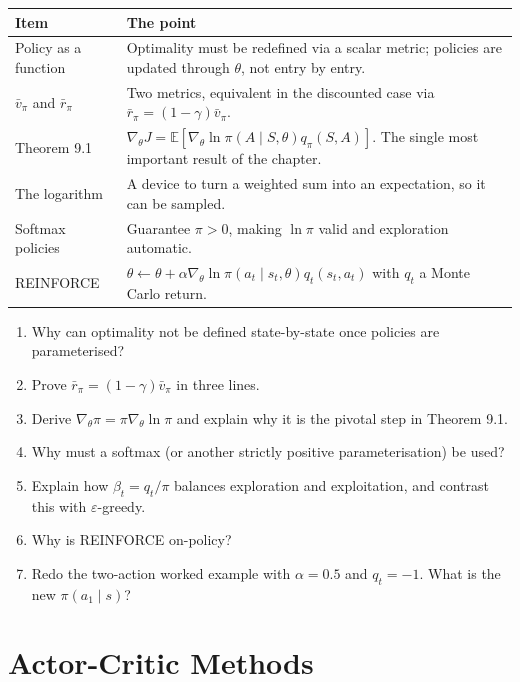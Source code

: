 \documentclass[11pt, letterpaper]{article}
\theoremstyle{runin}
\theoremstyle{runinplain}
\theoremstyle{remark}
\newcommand{\E}{\mathbb{E}}
\begin{document}
\begin{center}
\small
\begin{tabular}{@{}lp{}@{}}
\toprule
Item & The point \\
\midrule
Policy as a function & Optimality must be redefined via a scalar metric; policies are updated through $\theta$, not entry by entry. \\
$\bar v_\pi$ and $\bar r_\pi$ & Two metrics, equivalent in the discounted case via $\bar r_\pi=(1-\gamma)\bar v_\pi$. \\
Theorem 9.1 & $\nabla_\theta J=\E[\nabla_\theta\ln\pi(A\mid S,\theta)q_\pi(S,A)]$. The single most important result of the chapter. \\
The logarithm & A device to turn a weighted sum into an expectation, so it can be sampled. \\
Softmax policies & Guarantee $\pi>0$, making $\ln\pi$ valid and exploration automatic. \\
REINFORCE & $\theta\leftarrow\theta+\alpha\nabla_\theta\ln\pi(a_t\mid s_t,\theta)q_t(s_t,a_t)$ with $q_t$ a Monte Carlo return. \\
\bottomrule
\end{tabular}
\end{center}

\begin{enumerate}
  \item Why can optimality not be defined state-by-state once policies are
        parameterised?
  \item Prove $\bar r_\pi=(1-\gamma)\bar v_\pi$ in three lines.
  \item Derive $\nabla_\theta\pi=\pi\nabla_\theta\ln\pi$ and explain why it is the
        pivotal step in Theorem 9.1.
  \item Why must a softmax (or another strictly positive parameterisation) be used?
  \item Explain how $\beta_t=q_t/\pi$ balances exploration and exploitation, and
        contrast this with $\varepsilon$-greedy.
  \item Why is REINFORCE on-policy?
  \item Redo the two-action worked example with $\alpha=0.5$ and $q_t=-1$. What is
        the new $\pi(a_1\mid s)$?
\end{enumerate}

\newpage
\section{Actor-Critic Methods}
\end{document}
